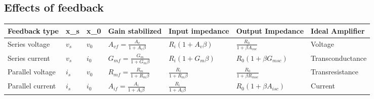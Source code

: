 \subsection{Effects of feedback}
\begin{table}[!ht]
	\centering
	\begin{adjustbox}{width=\textwidth}
		\begin{tabular}{|l|l|l|l|l|l|l|}
			\hline
			Feedback type    & x\_s  & x\_0  & Gain stabilized                    & Input impedance           & Output Impedance              & Ideal Amplifier  \\ \hline
			Series voltage   & $v_s$ & $v_0$ & $A_{vf} = \frac{A_v}{1+A_v \beta}$ & $R_i(1+A_v\beta)$         & $\frac{R_0}{1+\beta A_{voc}}$ & Voltage          \\ \hline
			Series current   & $v_s$ & $i_0$ & $G_{mf}=\frac{G_m}{1+G_m \beta}$   & $R_i(1+G_m \beta)$        & $R_0(1+\beta G_{msc})$        & Transconductance \\ \hline
			Parallel voltage & $i_s$ & $v_0$ & $R_{mf} = \frac{R_m}{1+R_m \beta}$ & $\frac{R_i}{1+R_m \beta}$ & $\frac{R_0}{1+\beta R_{moc}}$ & Transresistance  \\ \hline
			Parallel current & $i_s$ & $i_0$ & $A_{if}=\frac{A_i}{1+A_i \beta}$   & $\frac{R_i}{1+A_i \beta}$ & $R_0(1+\beta A_{isc})$        & Current          \\ \hline
		\end{tabular}
	\end{adjustbox}
\end{table}


